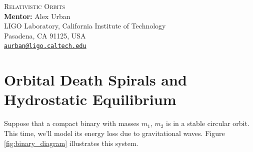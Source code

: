 \documentclass[11pt]{article}
\begin{document}
\begin{center}
{\Large\textsc{Relativistic Orbits}} \\
\vspace{10pt}
{\large \textbf{Mentor:} Alex Urban} \\
{\small LIGO Laboratory, California Institute of Technology \\
Pasadena, CA 91125, USA \\
\href{mailto:aurban@ligo.caltech.edu}{\texttt{aurban@ligo.caltech.edu}}}
\end{center}


\section*{Orbital Death Spirals and Hydrostatic Equilibrium}
\hspace{15pt} Suppose that a compact binary with masses $m_1$, $m_2$ is in a stable circular orbit. This time, we'll model its energy loss due to gravitational waves. Figure \ref{fig:binary_diagram} illustrates this system.

\vspace{20pt}
\end{document}
